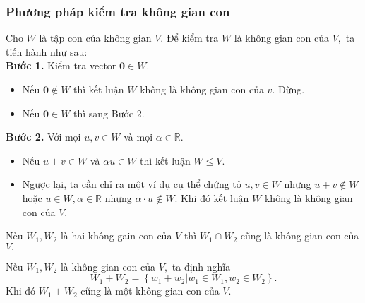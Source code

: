 \subsubsection{Phương pháp kiểm tra không gian con}
Cho $W$ là tập con của không gian $V.$ Để kiểm tra $W$ là không gian con của $V,$ ta tiến hành như sau:\\
\textbf{Bước 1.} Kiểm tra vector $\mathbf{0} \in W.$
\begin{itemize}
\item Nếu $\mathbf{0} \notin W$ thì kết luận $W$ không là không gian con của $v.$ Dừng.
\item Nếu $\mathbf{0} \in W$ thì sang Bước 2.
\end{itemize}
\textbf{Bước 2.} Với mọi $u, v \in W$ và mọi $\alpha \in \mathbb{R}.$
\begin{itemize}
\item Nếu $u + v \in W$ và $\alpha u \in W$ thì kết luận $W \leqslant V.$
\item Ngược lại, ta cần chỉ ra một ví dụ cụ thể chứng tỏ $u, v \in W$ nhưng $u + v \notin W$ hoặc $u \in W, \alpha \in \mathbb{R}$ nhưng $\alpha \cdot u \notin W.$ Khi đó kết luận $W$ không là không gian con của $V.$
\end{itemize}
\begin{mybox}
\begin{theorem}
Nếu $W_1, W_2$ là hai không gain con của $V$ thì $W_1 \cap W_2$ cũng là không gian con của $V.$
\end{theorem}
\end{mybox}
\begin{mybox}
\begin{theorem}
Nếu $W_1, W_2$ là không gian con của $V,$ ta định nghĩa
$${W_1} + {W_2} = \left\{ {{w_1} + \left. {{w_2}} \right|{w_1} \in {W_1},{w_2} \in {W_2}} \right\}.$$
Khi đó $W_1 + W_2$ cũng là một không gian con của $V.$
\end{theorem}
\end{mybox}
